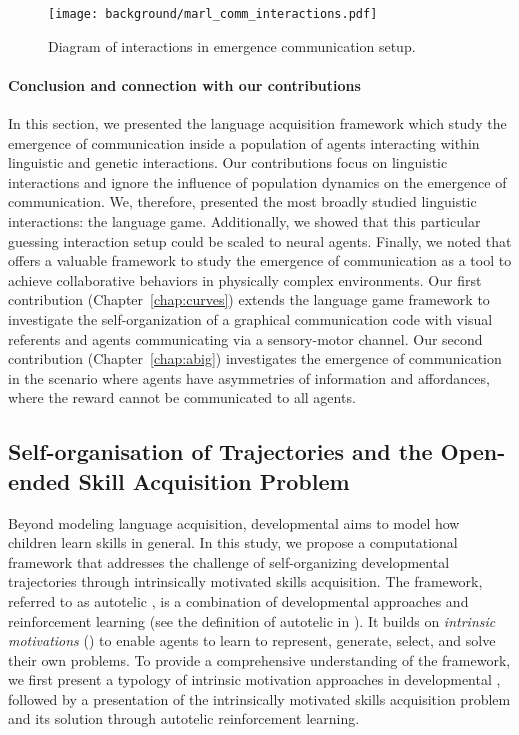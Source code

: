 \begin{figure}[!h]
\centering
\texttt{[image: background/marl\_comm\_interactions.pdf]}	
\caption{Diagram of interactions in \marl emergence communication setup.}
\label{fig:marl_comm_interactions}
\end{figure}


\paragraph{Conclusion and connection with our contributions}

In this section, we presented the language acquisition framework which study the emergence of communication inside a population of agents interacting within linguistic and genetic interactions. Our contributions focus on linguistic interactions and ignore the influence of population dynamics on the emergence of communication. We, therefore, presented the most broadly studied linguistic interactions: the language game. Additionally, we showed that this particular guessing interaction setup could be scaled to neural agents. Finally, we noted that \marl offers a valuable framework to study the emergence of communication as a tool to achieve collaborative behaviors in physically complex environments. Our first contribution (Chapter~\ref{chap:curves}) extends the language game framework to investigate the self-organization of a graphical communication code with visual referents and agents communicating via a sensory-motor channel. Our second contribution (Chapter~\ref{chap:abig}) investigates the emergence of communication in the scenario where agents have asymmetries of information and affordances, where the reward cannot be communicated to all agents.  

%
\newpage

\subsection{Self-organisation of Trajectories and the Open-ended Skill Acquisition Problem}
\label{sec:self-orga-traj}
%

Beyond modeling language acquisition, developmental \ai aims to model how children learn skills in general. In this study, we propose a computational framework that addresses the challenge of self-organizing developmental trajectories through intrinsically motivated skills acquisition. The framework, referred to as autotelic \rl, is a combination of developmental approaches and reinforcement learning (see the definition of autotelic in ).  It builds on \textit{intrinsic motivations} (\ims) to enable agents to learn to represent, generate, select, and solve their own problems. To provide a comprehensive understanding of the framework, we first present a typology of intrinsic motivation approaches in developmental \ai, followed by a presentation of the intrinsically motivated skills acquisition problem and its solution through autotelic reinforcement learning.


